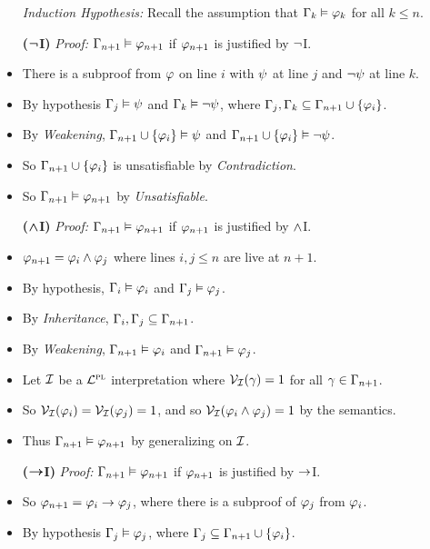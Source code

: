 \documentclass[a4paper, 11pt]{article} %
\begin{document}
\begin{itemize}
  \item[\it Induction Hypothesis:] Recall the assumption that $\Gamma_k \vDash \varphi_k$ for all $k \leq n$.
  \item[\bf ($\boldsymbol{\neg}$I)] \textit{Proof:} $\Gamma_{n+1} \vDash \varphi_{n+1}$ if $\varphi_{n+1}$ is justified by $\neg$I.
    \item There is a subproof from $\varphi$ on line $i$ with $\psi$ at line $j$ and $\neg\psi$ at line $k$. 
    \item By hypothesis $\Gamma_j\vDash \psi$ and $\Gamma_k\vDash\neg\psi$, where $\Gamma_j,\Gamma_k\subseteq\Gamma_{n+1}\cup\lbrace\varphi_i\rbrace$.
    \item By \textit{Weakening}, $\Gamma_{n+1}\cup\lbrace\varphi_i\rbrace\vDash\psi$ and $\Gamma_{n+1}\cup\lbrace\varphi_i\rbrace\vDash\neg\psi$.
    \item So $\Gamma_{n+1}\cup\lbrace\varphi_i\rbrace$ is unsatisfiable by \textit{Contradiction}.
    \item So $\Gamma_{n+1}\vDash\varphi_{n+1}$ by \textit{Unsatisfiable}.
  \item[\bf ($\boldsymbol{\wedge}$I)] \textit{Proof:} $\Gamma_{n+1} \vDash \varphi_{n+1}$ if $\varphi_{n+1}$ is justified by $\wedge$I.
    \item $\varphi_{n+1} = \varphi_i\wedge\varphi_j$ where lines $i,j\leq n$ are live at $n+1$.
    \item By hypothesis, $\Gamma_i\vDash\varphi_i$ and $\Gamma_j\vDash\varphi_j$.
    \item By \textit{Inheritance}, $\Gamma_i, \Gamma_j \subseteq \Gamma_{n+1}$.
    \item By \textit{Weakening}, $\Gamma_{n+1} \vDash \varphi_i$ and $\Gamma_{n+1} \vDash \varphi_j$.
    \item Let $\mathcal{I}$ be a $\mathcal{L}^{\textsc{pl}}$ interpretation where $\mathcal{V}_{\mathcal{I}}(\gamma) = 1$ for all $\gamma \in \Gamma_{n+1}$. 
    \item So $\mathcal{V}_{\mathcal{I}}(\varphi_i) = \mathcal{V}_{\mathcal{I}}(\varphi_j) = 1$, and so $\mathcal{V}_{\mathcal{I}}(\varphi_i \wedge \varphi_j) = 1$ by the semantics.
    \item Thus $\Gamma_{n+1}\vDash\varphi_{n+1}$ by generalizing on $\mathcal{I}$.
  \item[\bf ($\boldsymbol{\rightarrow}$I)] \textit{Proof:} $\Gamma_{n+1} \vDash \varphi_{n+1}$ if $\varphi_{n+1}$ is justified by $\rightarrow$I.
    \item So $\varphi_{n+1} = \varphi_i \rightarrow \varphi_j$, where there is a subproof of $\varphi_j$ from $\varphi_i$. 
    \item By hypothesis $\Gamma_j\vDash \varphi_j$, where $\Gamma_j\subseteq\Gamma_{n+1}\cup\lbrace\varphi_i\rbrace$.

\end{itemize}
\end{document}
